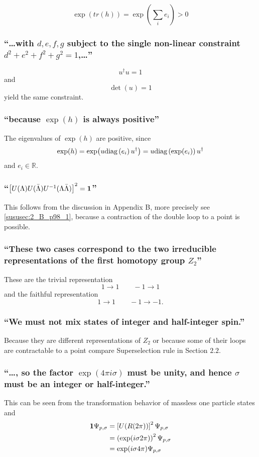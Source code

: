 \[\exp(tr(h))=\exp(\sum\limits_{i}e_i)>0\]

\subsubsection{\enquote{\dots with $d,e,f,g$ subject to the single non-linear constraint $d^2+e^2+f^2+g^2=1$,\dots} }
\[u^\dagger u=1\] and \[\det(u)=1\] yield the same constraint.

\subsubsection{\enquote{because $\exp(h)$ is always positive} }
The eigenvalues of $\exp(h)$ are positive, since
\[\exp(h)=\exp(u \text{diag}\left({e_i}\right) u^\dagger)=u \text{diag}\left({\exp(e_i)}\right) u^\dagger\]
and $e_i \in \mathbb{R}$.

\subsubsection{\enquote{$\left[U(\Lambda)U(\bar{\Lambda})U^{-1}(\Lambda\bar{\Lambda})\right]^2=\mathbf{1}$} }
This follows from the discussion in Appendix B, more precisely see \ref{sususec:2_B_p98_1}, because a contraction of the double loop to a point is possible.

\subsubsection{\enquote{These two cases correspond to the two irreducible representations of the first homotopy group $Z_2$} }
These are the trivial representation \[1\rightarrow1\qquad-1\rightarrow1\] and the faithful representation \[1\rightarrow1\qquad-1\rightarrow-1.\]

\subsubsection{\enquote{We must not mix states of integer and half-integer spin.} }
Because they are different representations of $Z_2$ or because some of their loops are contractable to a point compare Superselection rule in Section $2.2$.
\todo

\subsubsection{\enquote{\dots , so the factor $\exp(4\pi i \sigma)$ must be \textbf{unity}, and hence $\sigma$ must be an integer or half-integer.} }
This can be seen from the transformation behavior of massless one particle states  and 
\begin{align*}
	\mathbf{1} \Psi_{p,\sigma} &=\left[U(R(2\pi))\right]^2 \Psi_{p,\sigma}\\
	&=\left(\exp(i\sigma 2\pi)\right)^2\Psi_{p,\sigma}\\
	&=\exp(i\sigma 4\pi)\Psi_{p,\sigma}
\end{align*}\todo

